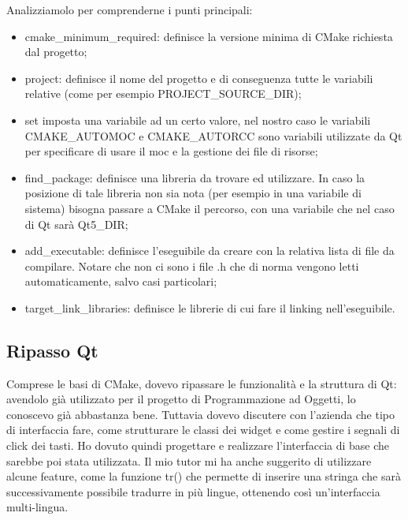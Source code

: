 Analizziamolo per comprenderne i punti principali:
\begin{itemize}
	\item cmake\_minimum\_required: definisce la versione minima di CMake richiesta dal progetto;
	\item project: definisce il nome del progetto e di conseguenza tutte le variabili relative (come per esempio PROJECT\_SOURCE\_DIR);
	\item set imposta una variabile ad un certo valore, nel nostro caso le variabili CMAKE\_AUTOMOC e CMAKE\_AUTORCC sono variabili utilizzate da Qt per specificare di usare il moc e la gestione dei file di risorse;
	\item find\_package: definisce una libreria da trovare ed utilizzare. In caso la posizione di tale libreria non sia nota (per esempio in una variabile di sistema) bisogna passare a CMake il percorso, con una variabile che nel caso di Qt sarà Qt5\_DIR;
	\item add\_executable: definisce l'eseguibile da creare con la relativa lista di file da compilare. Notare che non ci sono i file .h che di norma vengono letti automaticamente, salvo casi particolari;
	\item target\_link\_libraries: definisce le librerie di cui fare il linking nell'eseguibile.
\end{itemize}

\subsection{Ripasso Qt}
Comprese le basi di CMake, dovevo ripassare le funzionalità e la struttura di Qt: avendolo già utilizzato per il progetto di Programmazione ad Oggetti, lo conoscevo già abbastanza bene. Tuttavia dovevo discutere con l'azienda che tipo di interfaccia fare, come strutturare le classi dei widget e come gestire i segnali di click dei tasti. Ho dovuto quindi progettare e realizzare l'interfaccia di base che sarebbe poi stata utilizzata. Il mio tutor mi ha anche suggerito di utilizzare alcune feature, come la funzione tr() che permette di inserire una stringa che sarà successivamente possibile tradurre in più lingue, ottenendo così un'interfaccia multi-lingua.

